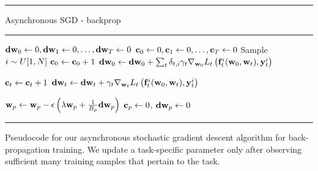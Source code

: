 \documentclass[10pt,twocolumn,letterpaper]{article}
\begin{document}
 \newcommand{\bstask}{\bs_{p}}
 \begin{table}
 	\hrule
 	\vspace{3pt}
 	Asynchronous SGD - backprop
 	\hrule
 	\begin{algorithmic}
 		\STATE {}
 		\STATE ${\mathrm{\mathbf{d}}\mathbf{w}_{0}} \leftarrow 0 , {\mathrm{\mathbf{d}}\mathbf{w}_{1}} \leftarrow 0,\ldots,{\mathrm{\mathbf{d}}\mathbf{w}_{T}} \leftarrow 0$  
 		\STATE {}
 		\STATE $\mathrm{\mathbf{c}}_{0} \leftarrow 0,\mathrm{\mathbf{c}}_{1} \leftarrow 0,\ldots,\mathrm{\mathbf{c}}_{T} \leftarrow 0$  
 		\STATE  Sample $i \sim U[1,N]$ 
 		\STATE {}
 		\STATE $\mathrm{\mathbf{c}}_{0} \leftarrow  \mathrm{\mathbf{c}}_{0} + 1$
 		\STATE ${\mathrm{\mathbf{d}}\mathbf{w}_{0}} \leftarrow {\mathrm{\mathbf{d}}\mathbf{w}_{0}} + \sum_{t} \delta_{t,i}\gamma_{t}\nabla_{\mathbf{w}_{0}}L_{t}\left(\mathbf{f}^{i}_{t}(\mathbf{w}_{0},\mathbf{w}_{t}),\mathbf{y}^{i}_{t}\right)$
 		
 		\STATE {}
 		\STATE $\mathrm{\mathbf{c}}_{t} \leftarrow  \mathrm{\mathbf{c}}_{t} +  1$
 		\STATE $ {\mathrm{\mathbf{d}}\mathbf{w}_{t}} \leftarrow {\mathrm{\mathbf{d}}\mathbf{w}_{t}} + \gamma_{t}\nabla_{\mathbf{w}_{t}}L_{t}\left(\mathbf{f}^{i}_{t}(\mathbf{w}_{0},\mathbf{w}_{t}),\mathbf{y}^{i}_{t}\right)$ 
 		\ENDIF
 		\ENDFOR	
 		
 		\IF{$\cnt{\tast}=\bstask$}
 		\STATE {}
 		\STATE $\prm{\tast} \setto \prm{\tast} - \epsilon\left( \lambda  \prm{\tast}   + \frac{1}{\bstask}\grad{\prm{\tast}} \right)$
 		\STATE $\mathrm{\mathbf{c}}_{p}\leftarrow 0 $, ${\mathrm{\mathbf{d}}\mathbf{w}_{p}} \leftarrow 0$
 		\ENDIF
 		\ENDFOR
 		\ENDFOR
 		\vspace{.2cm}
 		\hrule
 	\end{algorithmic}
 	\caption{Pseudocode for our asynchronous stochastic gradient descent algorithm for back-propagation training. We update a task-specific parameter only after observing  sufficient many training samples that pertain to the task. \label{async}}
 \end{table}
 
\end{document}

